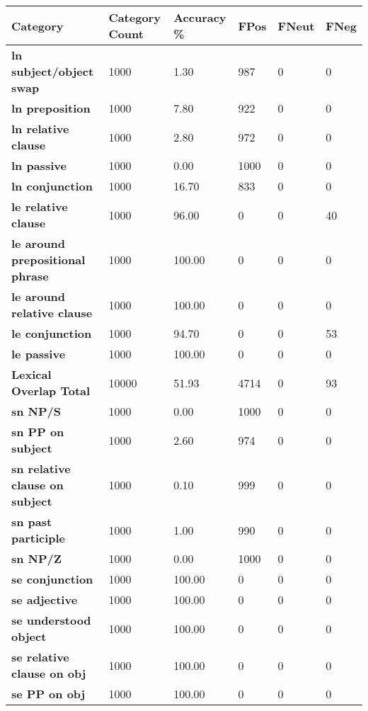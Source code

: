 \documentclass[11pt,a4paper]{article}
\begin{document}
\begin{table}[!hbt]
    \tiny
    \centering
    \begin{tabular}{p{}|p{} p{} p{} p{} p{} }
        \textbf{Category} & \textbf{Category Count} & \textbf{Accuracy \%} & \textbf{FPos} & \textbf{FNeut} & \textbf{FNeg} \\
        \hline
        \textbf{ln subject/object swap} & 1000 & 1.30 & 987 & 0 & 0 \\
        \textbf{ln preposition} & 1000 & 7.80 & 922 & 0 & 0 \\
        \textbf{ln relative clause} & 1000 & 2.80 & 972 & 0 & 0 \\
        \textbf{ln passive} & 1000 & 0.00 & 1000 & 0 & 0 \\
        \textbf{ln conjunction} & 1000 & 16.70 & 833 & 0 & 0 \\
        \textbf{le relative clause} & 1000 & 96.00 & 0 & 0 & 40 \\
        \textbf{le around prepositional phrase} & 1000 & 100.00 & 0 & 0 & 0 \\
        \textbf{le around relative clause} & 1000 & 100.00 & 0 & 0 & 0 \\
        \textbf{le conjunction} & 1000 & 94.70 & 0 & 0 & 53 \\
        \textbf{le passive} & 1000 & 100.00 & 0 & 0 & 0 \\
        \textbf{Lexical Overlap Total} & 10000 & 51.93 & 4714 & 0 & 93 \\
        \hline
        \textbf{sn NP/S} & 1000 & 0.00 & 1000 & 0 & 0 \\
        \textbf{sn PP on subject} & 1000 & 2.60 & 974 & 0 & 0 \\
        \textbf{sn relative clause on subject} & 1000 & 0.10 & 999 & 0 & 0 \\
        \textbf{sn past participle} & 1000 & 1.00 & 990 & 0 & 0 \\
        \textbf{sn NP/Z} & 1000 & 0.00 & 1000 & 0 & 0 \\
        \textbf{se conjunction} & 1000 & 100.00 & 0 & 0 & 0 \\
        \textbf{se adjective} & 1000 & 100.00 & 0 & 0 & 0 \\
        \textbf{se understood object} & 1000 & 100.00 & 0 & 0 & 0 \\
        \textbf{se relative clause on obj} & 1000 & 100.00 & 0 & 0 & 0 \\
        \textbf{se PP on obj} & 1000 & 100.00 & 0 & 0 & 0 \\

\end{tabular}
\end{table}
\end{document}
